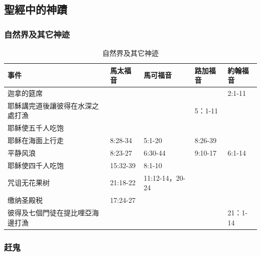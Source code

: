 

\subsection{聖經中的神蹟}

\subsubsection{自然界及其它神迹}

\begin{table}[htbp]
  \centering
    \begin{tabular}{|p{16.285em}|p{4.645em}|p{7.07em}|p{4.215em}|p{4.5em}|}
    \toprule
    \textbf{事件} & \textbf{馬太福音} & \textbf{馬可福音} & \textbf{路加福音} & \textbf{約翰福音} \\
    \midrule
    迦拿的筵席  &       &       &       & 2:1-11 \\
    \midrule
      耶穌講完道後讓彼得在水深之處打漁  &       &       &  5：1-11     &  \\
    \midrule  
    \multicolumn{1}{|l|}{耶稣使五千人吃饱} & \multicolumn{1}{l|}{} & \multicolumn{1}{l|}{} & \multicolumn{1}{l|}{} & \multicolumn{1}{l|}{} \\
    \midrule
    \multicolumn{1}{|l|}{耶稣在海面上行走} & 8:28-34 & 5:1-20 & 8:26-39 &   \\
    \midrule
    \multicolumn{1}{|l|}{平静风浪} & \multicolumn{1}{l|}{8:23-27} & \multicolumn{1}{l|}{6:30-44} & \multicolumn{1}{l|}{9:10-17} & \multicolumn{1}{l|}{6:1-14} \\
    \midrule
    耶稣使四千人吃饱  & 15:32-39 & 8:1-10 & \multicolumn{1}{l|}{} &   \\
    \midrule
    咒诅无花果树  & 21:18-22 & 11:12-14，20-24 &       &   \\
    \midrule
    缴纳圣殿税  & 17:24-27 &       &       &   \\
       \midrule
    彼得及七個門徒在提比哩亞海邊打漁  &   &       &       & 21：1-14  \\
    \bottomrule
    \end{tabular}%
     \caption{自然界及其它神迹}
  \label{tab:addlabel}%
\end{table}%




\subsubsection{赶鬼}

